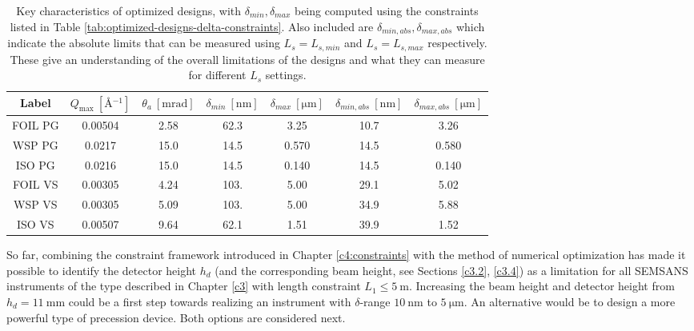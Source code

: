 \begin{table}[h!]
	\centering
	\begin{tabular}{c | c c c c | cc}
		\toprule
		Label & $Q_{\text{max}} ~[\unit{\angstrom^{-1}}]$ & $\theta_a~[\unit{\milli\radian}]$ & $\delta_{min}~[\unit{\nano\meter}]$ & $\delta_{max}~[\unit{\micro\meter}]$ & $\delta_{min,abs}~[\unit{\nano\meter}]$ & $\delta_{max,abs}~[\unit{\micro\meter}]$ \\
		\midrule
		FOIL PG & \num{0.00504} & \num{2.58} & \num{62.3} & \num{3.25} & \num{10.7} & \num{3.26} \\
		WSP PG & \num{0.0217} & \num{15.0} & \num{14.5} & \num{0.570} & \num{14.5} & \num{0.580} \\
		ISO PG & \num{0.0216} & \num{15.0} & \num{14.5} & \num{0.140} & \num{14.5} & \num{0.140} \\
		FOIL VS & \num{0.00305} & \num{4.24} & \num{103.} & \num{5.00} & \num{29.1} & \num{5.02} \\
		WSP VS & \num{0.00305} & \num{5.09} & \num{103.} & \num{5.00} & \num{34.9} & \num{5.88} \\
		ISO VS & \num{0.00507} & \num{9.64} & \num{62.1} & \num{1.51} & \num{39.9} & \num{1.52} \\
		\bottomrule
	\end{tabular}
	\caption{Key characteristics of optimized designs, with $\delta_{min}, \delta_{max}$ being computed using the constraints listed in Table \ref{tab:optimized-designs-delta-constraints}. Also included are $\delta_{min,abs}, \delta_{max,abs}$ which indicate the absolute limits that can be measured using $L_s = L_{s,min}$ and $L_s = L_{s,max}$ respectively. These give an understanding of the overall limitations of the designs and what they can measure for different $L_s$ settings.}
	\label{tab:optimized-designs-performance}
\end{table}

So far, combining the constraint framework introduced in Chapter \ref{c4:constraints} with the method of numerical optimization has made it possible to identify the detector height $h_d$ (and the corresponding beam height, see Sections \ref{c3.2}, \ref{c3.4}) as a limitation for all SEMSANS instruments of the type described in Chapter \ref{c3} with length constraint $L_1 \leq \SI{5}{\meter}$. Increasing the beam height and detector height from $h_d = \SI{11}{\milli\meter}$ could be a first step towards realizing an instrument with $\delta$-range $\SI{10}{\nano\meter}$ to $ \SI{5}{\micro\meter}$. An alternative would be to design a more powerful type of precession device. Both options are considered next.

